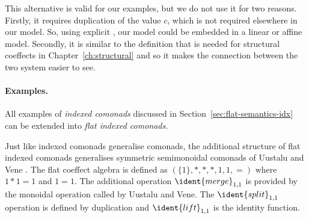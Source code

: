 This alternative is valid for our examples, but we do not use it for two reasons. Firstly, it 
requires duplication of the value $c$, which is not required elsewhere in our model. So, using 
explicit , our model could be embedded in a linear or affine model. Secondly, it
is similar to the definition that is needed for structural coeffects in Chapter~\ref{ch:structural}
and so it makes the connection between the two system easier to see.

\paragraph{Examples.}
All examples of \emph{indexed comonads} discussed in Section~\ref{sec:flat-semantics-idx} can
be extended into \emph{flat indexed comonads}. 

\begin{example}
Just like indexed comonads generalise co\-monads, the additional structure of
flat indexed comonads generalises symmetric semimonoidal comonads of Uustalu 
and Vene \cite{comonads-notions}. The flat coeffect algebra is defined as $(\{1\}, \ast, \ast, \ast, 1, 1, =)$
where $1\ast1=1$ and $1=1$. The additional operation $\ident{merge}_{1,1}$ is provided by the 
monoidal operation called  by Uustalu and Vene. The $\ident{split}_{1,1}$ operation 
is defined by duplication and $\ident{lift}_{1,1}$ is the identity function.
\end{example}

